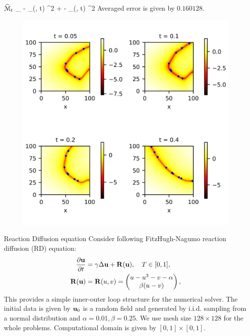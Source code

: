 \documentclass{beamer}
\begin{document}
\begin{frame}{$\widehat {\mathcal{M}}_t $}
	\bequn
		\min_{\theta} \mbE \norml \mfu - \phi_{\theta}(\mfx, t) \normr^2 + \lambda \norml \wht \mfu - \phi_{\theta}(\wht \mfx, t) \normr^2
	\eequn
	Averaged error is given by $0.160128$.
	\begin{figure}[H]
          \centering
          \centerline{\includegraphics[width=0.65\linewidth]{fig/control4.jpg}}
          \label{l2-mfd}
	\end{figure}
\end{frame}


\begin{frame}{Reaction Diffusion equation}
	Consider following FitzHugh-Nagumo reaction diffusion (RD) equation:
	\begin{equation}\label{FN}
    \begin{aligned}
        	\frac{\partial \mathbf{u}}{\partial t} & = \gamma \Delta \mathbf{u} + \mathbf{R}(\mathbf{u}), \quad T \in [0, 1], 	\\
		\mathbf{R}(\mathbf{u}) & = \mathbf{R}(u, v) = \begin{pmatrix}
			u - u^3 - v - \alpha	\\
			\beta(u - v)
		\end{pmatrix},
    \end{aligned}
	\end{equation}
	This provides a simple inner-outer loop structure for the numerical solver. The initial data is given by $\mathbf{u}_0$ is a random field and generated by i.i.d. sampling from a normal distribution and $\alpha = 0.01, \beta=0.25$. We use mesh size $128 \times 128$ for the whole problems. Computational domain is given by $[0, 1]\times[0, 1]$.
\end{frame}
\end{document}
